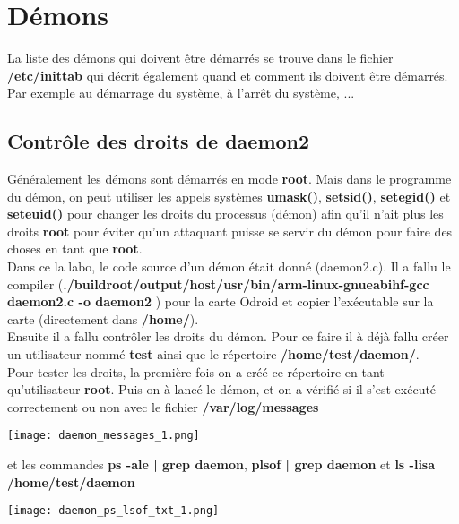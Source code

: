 \section{Démons}
La liste des démons qui doivent être démarrés se trouve dans le fichier \textbf{/etc/inittab} qui décrit également quand et comment ils doivent être démarrés. Par exemple au démarrage du système, à l'arrêt du système, ...\\

\subsection{Contrôle des droits de daemon2}

Généralement les démons sont démarrés en mode \textbf{root}. Mais dans le programme du démon, on peut utiliser les appels systèmes \textbf{umask()}, \textbf{setsid()}, \textbf{setegid()} et \textbf{seteuid()} pour changer les droits du processus (démon) afin qu'il n'ait plus les droits \textbf{root} pour éviter qu'un attaquant puisse se servir du démon pour faire des choses en tant que \textbf{root}. \\

Dans ce la labo, le code source d'un démon était donné (daemon2.c). Il a fallu le compiler (\textbf{./buildroot/output/host/usr/bin/arm-linux-gnueabihf-gcc daemon2.c -o daemon2}
) pour la carte Odroid et copier l'exécutable sur la carte (directement dans \textbf{/home/}). \\

Ensuite il a fallu contrôler les droits du démon. Pour ce faire il à déjà fallu créer un utilisateur nommé \textbf{test} ainsi que le répertoire \textbf{/home/test/daemon/}.\\

Pour tester les droits, la première fois on a créé ce répertoire en tant qu'utilisateur \textbf{root}. Puis on à lancé le démon, et on a vérifié si il s'est exécuté correctement ou non avec le fichier \textbf{/var/log/messages}

\begin{center} 
\hspace{15cm}
\texttt{[image: daemon\_messages\_1.png]}
\end{center}
\vspace{0.5cm}

et les commandes \textbf{ps -ale | grep daemon}, \textbf{plsof | grep daemon} et \textbf{ls -lisa /home/test/daemon}

\begin{center} 
\hspace{15cm}
\texttt{[image: daemon\_ps\_lsof\_txt\_1.png]}
\end{center}
\vspace{0.5cm}

